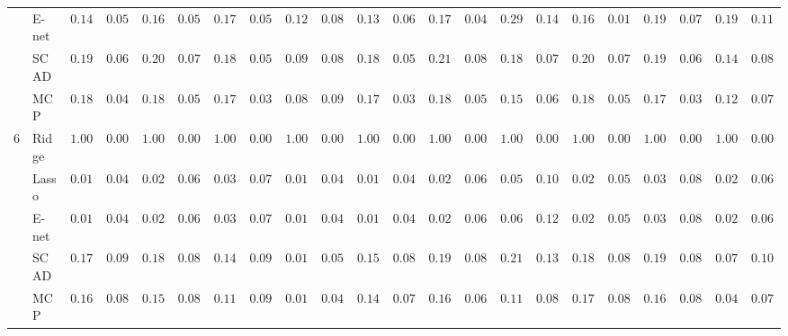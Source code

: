 \begin{tabular}{ll|ll|llllll|llllll|llllll}
 & E-net  & $0.1483$ & $0.0524$ & $0.1667$ & $0.0580$ & $0.1700$ & $0.0529$ & $0.1217$ & $0.0849$ & $0.1367$ & $0.0686$ & $0.1700$ & $0.0473$ & $0.2983$ & $0.1466$ & $0.1650$ & $0.0167$ & $0.1967$ & $0.0763$ & $0.1950$ & $0.1112$ \\
 & SCAD  & $0.1950$ & $0.0672$ & $0.2017$ & $0.0760$ & $0.1867$ & $0.0544$ & $0.0983$ & $0.0889$ & $0.1867$ & $0.0594$ & $0.2117$ & $0.0816$ & $0.1817$ & $0.0789$ & $0.2000$ & $0.0786$ & $0.1983$ & $0.0699$ & $0.1400$ & $0.0877$ \\
 & MCP  & $0.1800$ & $0.0454$ & $0.1850$ & $0.0524$ & $0.1700$ & $0.0333$ & $0.0833$ & $0.0902$ & $0.1750$ & $0.0365$ & $0.1883$ & $0.0563$ & $0.1533$ & $0.0656$ & $0.1800$ & $0.0512$ & $0.1733$ & $0.0328$ & $0.1200$ & $0.0789$ \\\hline
6 & Ridge  & $1.0000$ & $0.0000$ & $1.0000$ & $0.0000$ & $1.0000$ & $0.0000$ & $1.0000$ & $0.0000$ & $1.0000$ & $0.0000$ & $1.0000$ & $0.0000$ & $1.0000$ & $0.0000$ & $1.0000$ & $0.0000$ & $1.0000$ & $0.0000$ & $1.0000$ & $0.0000$ \\
 & Lasso  & $0.0133$ & $0.0454$ & $0.0267$ & $0.0658$ & $0.0333$ & $0.0749$ & $0.0117$ & $0.0427$ & $0.0150$ & $0.0479$ & $0.0283$ & $0.0629$ & $0.0517$ & $0.1024$ & $0.0233$ & $0.0581$ & $0.0383$ & $0.0882$ & $0.0233$ & $0.0671$ \\
 & E-net  & $0.0133$ & $0.0454$ & $0.0267$ & $0.0658$ & $0.0333$ & $0.0749$ & $0.0133$ & $0.0454$ & $0.0133$ & $0.0454$ & $0.0283$ & $0.0629$ & $0.0617$ & $0.1223$ & $0.0233$ & $0.0581$ & $0.0350$ & $0.0896$ & $0.0250$ & $0.0686$ \\
 & SCAD  & $0.1733$ & $0.0974$ & $0.1800$ & $0.0876$ & $0.1400$ & $0.0969$ & $0.0167$ & $0.0503$ & $0.1550$ & $0.0829$ & $0.1967$ & $0.0867$ & $0.2100$ & $0.1394$ & $0.1850$ & $0.0883$ & $0.1917$ & $0.0898$ & $0.0733$ & $0.1068$ \\
 & MCP  & $0.1600$ & $0.0851$ & $0.1567$ & $0.0848$ & $0.1100$ & $0.0924$ & $0.0117$ & $0.0427$ & $0.1467$ & $0.0796$ & $0.1683$ & $0.0690$ & $0.1150$ & $0.0810$ & $0.1733$ & $0.0818$ & $0.1667$ & $0.0854$ & $0.0433$ & $0.0735$ \\
\hline 
\end{tabular}


